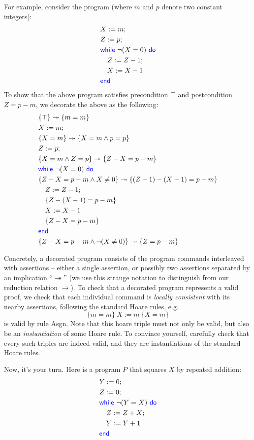 \documentclass[11pt,a4paper]{article}
\newcommand{\kword}[1]{{\color{blue} \textsf{#1}}}
\newcommand{\While}{\kword{while}}
\newcommand{\Do}{\kword{do}}
\newcommand{\End}{\kword{end}}
\let\implies\twoheadrightarrow
\begin{document}
For example, consider the program (where $m$ and $p$ denote two constant integers):
\begin{align*}
    & X := m; \\
    & Z := p; \\
    & \While~\lnot(X = 0)~\Do \\
    &\quad Z := Z - 1; \\
    &\quad X := X - 1 \\
    &\End
\end{align*}
To show that the above program satisfies precondition $\top$ and postcondition $Z = p - m$,
we decorate the above as the following:
\begin{align*}
    & \{\top\} \implies \{m=m\} \\
    & X := m; \\
    & \{X=m\} \implies \{X = m \land p = p\} \\
    & Z := p; \\
    & \{X = m \land Z = p \} \implies \{Z - X = p - m\} \\
    & \While~\lnot(X = 0)~\Do \\
    & \{Z - X = p - m \land X \not= 0\} \implies \{(Z - 1) - (X - 1) = p - m\} \\
    &\quad Z := Z - 1; \\
    &\quad \{Z - (X - 1) = p - m\} \\
    &\quad X := X - 1 \\
    &\quad \{Z - X = p - m\} \\
    &\End \\
    &\{Z - X = p - m \land \lnot(X \not= 0)\} \implies \{Z = p - m\}
\end{align*}

Concretely, a decorated program consists of the program commands interleaved with assertions --
either a single assertion, or possibly two assertions separated by an implication ``$\implies$''
(we use this strange notation to distinguish from our reduction relation $\to$).
To check that a decorated program represents a valid proof,
we check that each individual command is \emph{locally consistent} with its nearby assertions,
following the standard Hoare rules, e.g. $$\{m=m\}~X := m~\{X=m\}$$ is valid by rule Asgn.
Note that this hoare triple must not only be valid, but also be an \emph{instantiation} of some Hoare rule.
To convince yourself, carefully check that every such triples are indeed valid, and they are instantiations of
the standard Hoare rules.

Now, it's your turn. Here is a program $P$ that squares $X$ by repeated addition:
\begin{align*}
    & Y := 0; \\
    & Z := 0; \\
    & \While~\lnot(Y = X)~\Do \\
    &\quad Z := Z + X; \\
    &\quad Y := Y + 1 \\
    & \End
\end{align*}
\end{document}
